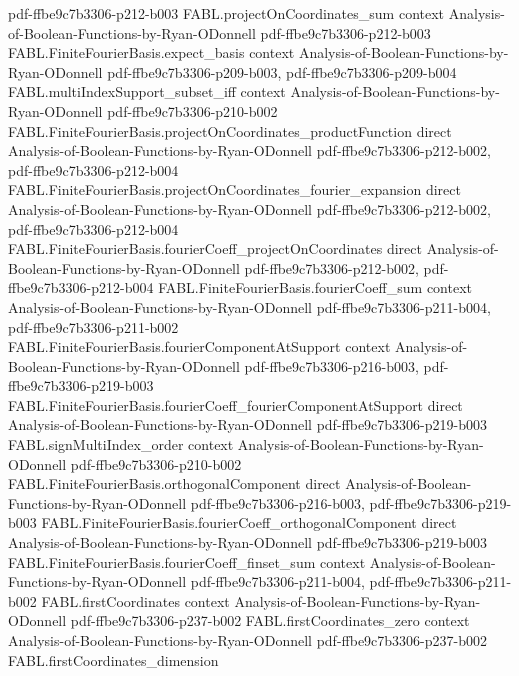 \begin{theorem}
  {pdf-ffbe9c7b3306-p212-b003}
\proofstep
  {FABL.projectOnCoordinates_sum}
  {context}
  {Analysis-of-Boolean-Functions-by-Ryan-ODonnell}
  {pdf-ffbe9c7b3306-p212-b003}
\proofstep
  {FABL.FiniteFourierBasis.expect_basis}
  {context}
  {Analysis-of-Boolean-Functions-by-Ryan-ODonnell}
  {pdf-ffbe9c7b3306-p209-b003,
    pdf-ffbe9c7b3306-p209-b004}
\proofstep
  {FABL.multiIndexSupport_subset_iff}
  {context}
  {Analysis-of-Boolean-Functions-by-Ryan-ODonnell}
  {pdf-ffbe9c7b3306-p210-b002}
\proofstep
  {FABL.FiniteFourierBasis.projectOnCoordinates_productFunction}
  {direct}
  {Analysis-of-Boolean-Functions-by-Ryan-ODonnell}
  {pdf-ffbe9c7b3306-p212-b002,
    pdf-ffbe9c7b3306-p212-b004}
\proofstep
  {FABL.FiniteFourierBasis.projectOnCoordinates_fourier_expansion}
  {direct}
  {Analysis-of-Boolean-Functions-by-Ryan-ODonnell}
  {pdf-ffbe9c7b3306-p212-b002,
    pdf-ffbe9c7b3306-p212-b004}
\proofstep
  {FABL.FiniteFourierBasis.fourierCoeff_projectOnCoordinates}
  {direct}
  {Analysis-of-Boolean-Functions-by-Ryan-ODonnell}
  {pdf-ffbe9c7b3306-p212-b002,
    pdf-ffbe9c7b3306-p212-b004}
\proofstep
  {FABL.FiniteFourierBasis.fourierCoeff_sum}
  {context}
  {Analysis-of-Boolean-Functions-by-Ryan-ODonnell}
  {pdf-ffbe9c7b3306-p211-b004,
    pdf-ffbe9c7b3306-p211-b002}
\proofstep
  {FABL.FiniteFourierBasis.fourierComponentAtSupport}
  {context}
  {Analysis-of-Boolean-Functions-by-Ryan-ODonnell}
  {pdf-ffbe9c7b3306-p216-b003,
    pdf-ffbe9c7b3306-p219-b003}
\proofstep
  {FABL.FiniteFourierBasis.fourierCoeff_fourierComponentAtSupport}
  {direct}
  {Analysis-of-Boolean-Functions-by-Ryan-ODonnell}
  {pdf-ffbe9c7b3306-p219-b003}
\proofstep
  {FABL.signMultiIndex_order}
  {context}
  {Analysis-of-Boolean-Functions-by-Ryan-ODonnell}
  {pdf-ffbe9c7b3306-p210-b002}
\proofstep
  {FABL.FiniteFourierBasis.orthogonalComponent}
  {direct}
  {Analysis-of-Boolean-Functions-by-Ryan-ODonnell}
  {pdf-ffbe9c7b3306-p216-b003,
    pdf-ffbe9c7b3306-p219-b003}
\proofstep
  {FABL.FiniteFourierBasis.fourierCoeff_orthogonalComponent}
  {direct}
  {Analysis-of-Boolean-Functions-by-Ryan-ODonnell}
  {pdf-ffbe9c7b3306-p219-b003}
\proofstep
  {FABL.FiniteFourierBasis.fourierCoeff_finset_sum}
  {context}
  {Analysis-of-Boolean-Functions-by-Ryan-ODonnell}
  {pdf-ffbe9c7b3306-p211-b004,
    pdf-ffbe9c7b3306-p211-b002}
\proofstep
  {FABL.firstCoordinates}
  {context}
  {Analysis-of-Boolean-Functions-by-Ryan-ODonnell}
  {pdf-ffbe9c7b3306-p237-b002}
\proofstep
  {FABL.firstCoordinates_zero}
  {context}
  {Analysis-of-Boolean-Functions-by-Ryan-ODonnell}
  {pdf-ffbe9c7b3306-p237-b002}
\proofstep
  {FABL.firstCoordinates_dimension}

\end{theorem}
